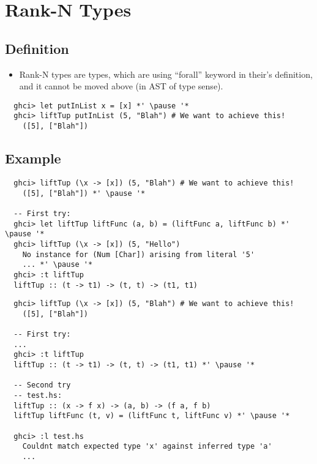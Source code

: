 \documentclass[aspectratio=43]{beamer}
\begin{document}
\section{Rank-N Types}

\subsection{Definition}

\begin{frame}[fragile]
 \begin{itemize}
  \item Rank-N types are types, which are using ``forall'' keyword in their's definition, and it cannot be moved above (in AST of type sense).
 \end{itemize}
 \pause
 \begin{lstlisting}
  ghci> let putInList x = [x] *' \pause '*
  ghci> liftTup putInList (5, "Blah") # We want to achieve this!
    ([5], ["Blah"])
 \end{lstlisting}
\end{frame}

\subsection{Example}

\begin{frame}[fragile]
 \begin{lstlisting}
  ghci> liftTup (\x -> [x]) (5, "Blah") # We want to achieve this!
    ([5], ["Blah"]) *' \pause '*
  
  -- First try:
  ghci> let liftTup liftFunc (a, b) = (liftFunc a, liftFunc b) *' \pause '*
  ghci> liftTup (\x -> [x]) (5, "Hello")
    No instance for (Num [Char]) arising from literal '5'
    ... *' \pause '*
  ghci> :t liftTup
  liftTup :: (t -> t1) -> (t, t) -> (t1, t1)
 \end{lstlisting}
\end{frame}

\begin{frame}[fragile]
 \begin{lstlisting}
  ghci> liftTup (\x -> [x]) (5, "Blah") # We want to achieve this!
    ([5], ["Blah"])
  
  -- First try:
  ...
  ghci> :t liftTup
  liftTup :: (t -> t1) -> (t, t) -> (t1, t1) *' \pause '*
  
  -- Second try
  -- test.hs:
  liftTup :: (x -> f x) -> (a, b) -> (f a, f b)
  liftTup liftFunc (t, v) = (liftFunc t, liftFunc v) *' \pause '*
  
  ghci> :l test.hs
    Couldnt match expected type 'x' against inferred type 'a' 
    ...
 \end{lstlisting}
\end{frame}
\end{document}
